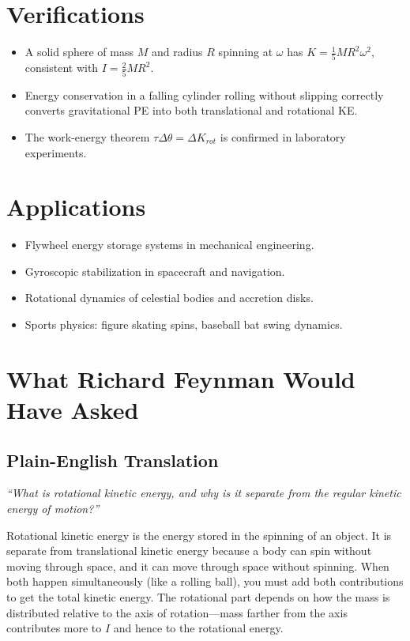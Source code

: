 \documentclass[11pt,openright]{book}
\begin{document}
\section*{Verifications}

\begin{itemize}
    \item A solid sphere of mass $M$ and radius $R$ spinning at $\omega$ has $K = \frac{1}{5}MR^2\omega^2$, consistent with $I = \frac{2}{5}MR^2$.
    \item Energy conservation in a falling cylinder rolling without slipping correctly converts gravitational PE into both translational and rotational KE.
    \item The work-energy theorem $\tau\Delta\theta = \Delta K_{rot}$ is confirmed in laboratory experiments.
\end{itemize}
\section*{Applications}

\begin{itemize}
    \item Flywheel energy storage systems in mechanical engineering.
    \item Gyroscopic stabilization in spacecraft and navigation.
    \item Rotational dynamics of celestial bodies and accretion disks.
    \item Sports physics: figure skating spins, baseball bat swing dynamics.
\end{itemize}
\section*{What Richard Feynman Would Have Asked}

\subsection*{Plain-English Translation}
\textit{``What is rotational kinetic energy, and why is it separate from the regular kinetic energy of motion?''}

Rotational kinetic energy is the energy stored in the spinning of an object. It is separate from translational kinetic energy because a body can spin without moving through space, and it can move through space without spinning. When both happen simultaneously (like a rolling ball), you must add both contributions to get the total kinetic energy. The rotational part depends on how the mass is distributed relative to the axis of rotation---mass farther from the axis contributes more to $I$ and hence to the rotational energy.
\end{document}
